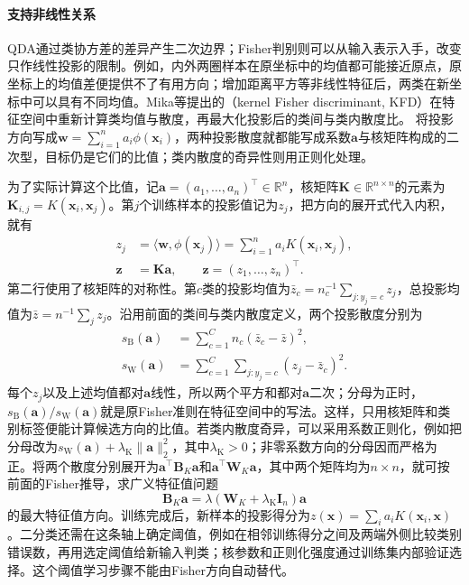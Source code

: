 \paragraph{支持非线性关系}
\label{sec:classification-lda-kernel-extension}
QDA通过类协方差的差异产生二次边界；Fisher判别则可以从输入表示入手，改变只作线性投影的限制。例如，内外两圈样本在原坐标中的均值都可能接近原点，原坐标上的均值差便提供不了有用方向；增加距离平方等非线性特征后，两类在新坐标中可以具有不同均值。Mika等提出的（kernel Fisher discriminant, KFD）在特征空间中重新计算类均值与散度，再最大化投影后的类间与类内散度比。
将投影方向写成$\bm{w}=\sum_{i=1}^n a_i\phi(\bm{x}_i)$，两种投影散度就都能写成系数$\bm{a}$与核矩阵构成的二次型，目标仍是它们的比值；类内散度的奇异性则用正则化处理。

为了实际计算这个比值，记$\bm a=(a_1,\ldots,a_n)^\top\in\mathbb R^n$，核矩阵$\bm K\in\mathbb R^{n\times n}$的元素为$\bm K_{i,j}=K(\bm x_i,\bm x_j)$。第$j$个训练样本的投影值记为$z_j$，把方向的展开式代入内积，就有
\begin{equation}
  \begin{aligned}
    z_j&=\langle\bm w,\phi(\bm x_j)\rangle
        =\sum_{i=1}^n a_i K(\bm x_i,\bm x_j),\\
    \bm z&=\bm K\bm a,\qquad
      \bm z=(z_1,\ldots,z_n)^\top .
  \end{aligned}
  \label{eq:classification-kfd-projected-samples}
\end{equation}
第二行使用了核矩阵的对称性。第$c$类的投影均值为$\bar z_c=n_c^{-1}\sum_{j:y_j=c}z_j$，总投影均值为$\bar z=n^{-1}\sum_j z_j$。沿用前面的类间与类内散度定义，两个投影散度分别为
\begin{equation}
  \begin{aligned}
    s_{\mathrm B}(\bm a)
      &=\sum_{c=1}^C n_c(\bar z_c-\bar z)^2,\\
    s_{\mathrm W}(\bm a)
      &=\sum_{c=1}^C\sum_{j:y_j=c}(z_j-\bar z_c)^2 .
  \end{aligned}
  \label{eq:classification-kfd-projected-scatter}
\end{equation}
每个$z_j$以及上述均值都对$\bm a$线性，所以两个平方和都对$\bm a$二次；分母为正时，$s_{\mathrm B}(\bm a)/s_{\mathrm W}(\bm a)$就是原Fisher准则在特征空间中的写法。这样，只用核矩阵和类别标签便能计算候选方向的比值。若类内散度奇异，可以采用系数正则化，例如把分母改为$s_{\mathrm W}(\bm a)+\lambda_{\mathrm K}\lVert\bm a\rVert_2^2$，其中$\lambda_{\mathrm K}>0$；非零系数方向的分母因而严格为正。将两个散度分别展开为$\bm a^\top\bm B_K\bm a$和$\bm a^\top\bm W_K\bm a$，其中两个矩阵均为$n\times n$，就可按前面的Fisher推导，求广义特征值问题
\[
  \bm B_K\bm a=\lambda(\bm W_K+\lambda_{\mathrm K}\bm I_n)\bm a
\]
的最大特征值方向。训练完成后，新样本的投影得分为$z(\bm x)=\sum_i a_iK(\bm x_i,\bm x)$。二分类还需在这条轴上确定阈值，例如在相邻训练得分之间及两端外侧比较类别错误数，再用选定阈值给新输入判类；核参数和正则化强度通过训练集内部验证选择。这个阈值学习步骤不能由Fisher方向自动替代。

